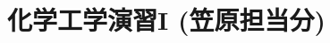 \documentclass[11pt,a4]{jsbook}
\numberwithin{equation}{section}
\begin{document}
\title{化学工学演習I (笠原担当分)}
\maketitle
\tableofcontents




%
\end{document}
